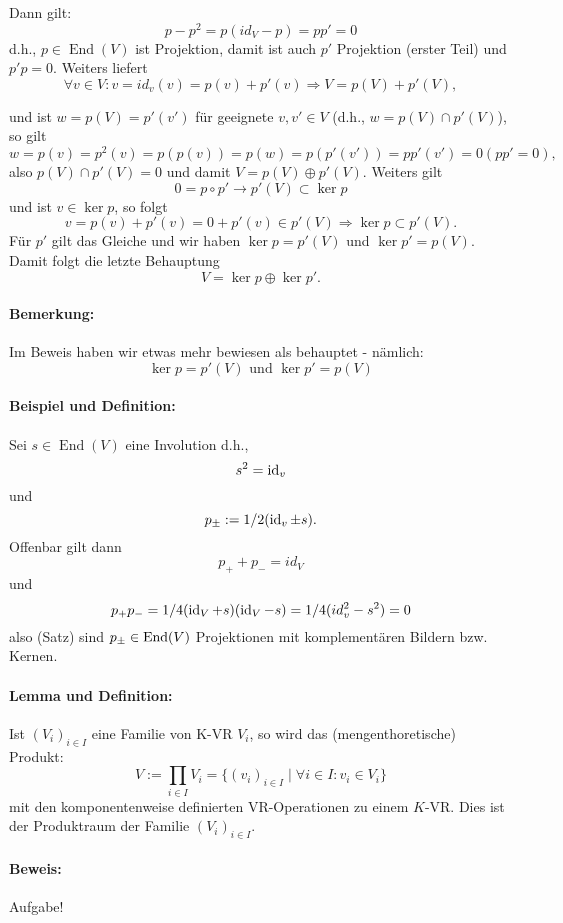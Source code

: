 	Dann gilt:
		\[p-p^2 = p(id_V-p) = pp' = 0\]
	d.h., $p\in\operatorname{End}(V)$ ist Projektion, damit ist auch $p'$ Projektion (erster Teil) und $p' p = 0 $. Weiters liefert
		\[\forall v\in V: v=id_v(v) = p(v) + p'(v) \Rightarrow V = p(V)+p'(V),\]

	und ist $w = p(V)= p'(v')$ für geeignete $v,v'\in V$ (d.h., $w  = p(V)\cap p'(V)$), so gilt
		\[ w = p(v) = p^2(v) = p(p(v)) = p(w) = p(p'(v')) = pp'(v') = 0 (pp' = 0), \]
	also $p(V)\cap p'(V) = {0}$ und damit $V = p(V)\oplus p'(V)$. Weiters gilt
		\[0 = p \circ p' \rightarrow p'(V)\subset \ker p\]
	und ist $v\in \ker p$, so folgt
		\[v = p(v) + p'(v) = 0 + p'(v)\in p'(V) \Rightarrow \ker p \subset p'(V).\]
	Für $p'$ gilt das Gleiche und wir haben $\ker p = p'(V)$ und $\ker p' = p(V)$.
	Damit folgt die letzte Behauptung 
		\[V = \ker p \oplus\ker p'.\]
	
\paragraph{Bemerkung: }
		Im Beweis haben wir etwas mehr bewiesen als behauptet - nämlich:
			\[ \ker p = p'(V)\text{ und }\ker p' = p(V) \]
		
\paragraph{Beispiel und Definition: }	
		Sei $s\in \operatorname{End}(V)$ eine Involution d.h., 
			\[ s^2 = \operatorname{id}_v \] 
		und 
			\[ p_\pm := 1/2(\operatorname{id}_v\pm s). \]
		Offenbar gilt dann
			\[ p_{+} + p_{-} = id_V \] 
		und 
			\[ p_+ p_{-} = 1/4(\operatorname{id}_V +s)(\operatorname{id}_V -s) = 1/4(id_v^2-s^2)=0 \]
		also (Satz) sind $p_\pm\in\operatorname{End}(V)$ Projektionen mit komplementären Bildern bzw. Kernen.
		
\paragraph{Lemma und Definition: }
		Ist $(V_i)_{i\in I}$ eine Familie von K-VR $V_i$, so wird das (mengenthoretische) Produkt:
			\[V:= \prod_{i\in I}V_i=\{(v_i)_{i\in I}\mid\forall i\in I:v_i\in V_i\}\]
		mit den komponentenweise definierten VR-Operationen zu einem $ K $-VR. Dies ist der Produktraum der Familie	$(V_i)_{i\in I}$.
		
\paragraph{Beweis: } Aufgabe!

